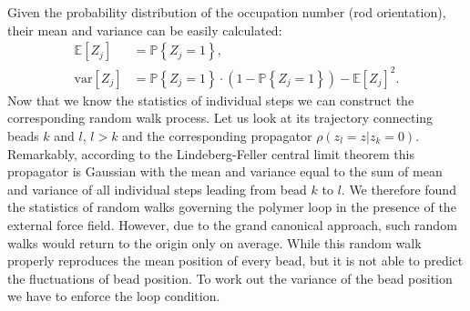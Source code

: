\documentclass[aps,showpacs,twocolumn,floatfix,prx,superscriptaddress]{revtex4-1}
\begin{document}
Given the probability distribution of the occupation number (rod orientation), their mean
and variance can be easily
calculated:
\begin{subequations}
    \begin{align}
        \label{eq:zmean}
        \mathbb{E}\left[Z_j\right] & =  \mathbb{P} \left\{ Z_j = 1\right\} ,\\
        \label{eq:zvar}
        \text{var}\left[Z_j\right] & = \mathbb{P} \left\{ Z_j = 1\right\} \cdot
        \left( 1 - \mathbb{P} \left\{ Z_j = 1\right\} \right) -
        \mathbb{E}\left[Z_j\right]^2.
    \end{align}
\end{subequations}
Now that we know the statistics of individual steps we can construct the corresponding random walk process. Let us look at its trajectory connecting beads $k$ and $l$, $l>k$ and the corresponding propagator $\rho(z_l=z|z_k=0)$. Remarkably, according to the Lindeberg-Feller central limit theorem \cite{} this propagator is  Gaussian with the mean and variance equal to the sum of mean and variance of all individual steps leading from bead $k$ to $l$. We therefore found the statistics of random walks governing the polymer loop in the presence of the external force field. However, due to the grand canonical approach, such random walks would return to the origin only on average. While this random walk properly reproduces the mean position of every bead, but it is not able to predict the fluctuations of bead position. To work out the variance of the bead position we have to enforce the loop condition.
 
\end{document}
